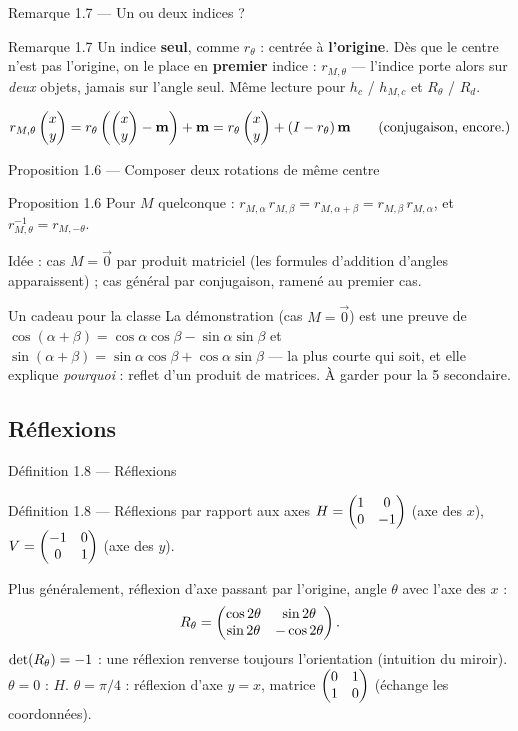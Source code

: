 \begin{frame}{Remarque 1.7 --- Un ou deux indices ?}
  \begin{Rem}{Remarque 1.7}
    Un indice \textbf{seul}, comme $r_\theta$ : centrée à
    \textbf{l'origine}. Dès que le centre n'est pas l'origine, on le
    place en \textbf{premier} indice : $r_{M,\theta}$ --- l'indice
    porte alors sur \emph{deux} objets, jamais sur l'angle seul. Même
    lecture pour $h_c$ / $h_{M,c}$ et $R_\theta$ / $R_d$.
  \end{Rem}
  \[
    r_{M,\theta}\begin{pmatrix}x\\ y\end{pmatrix}
      = r_\theta\left(\begin{pmatrix}x\\ y\end{pmatrix} - \mathbf{m}\right) + \mathbf{m}
      = r_\theta\begin{pmatrix}x\\ y\end{pmatrix} + (I - r_\theta)\,\mathbf{m}
      \qquad\text{(conjugaison, encore.)}
  \]
\end{frame}

\begin{frame}{Proposition 1.6 --- Composer deux rotations de même centre}
  \begin{Enonce}{Proposition 1.6}
    Pour $M$ quelconque :
    $r_{M,\alpha}\,r_{M,\beta} = r_{M,\alpha+\beta} = r_{M,\beta}\,r_{M,\alpha}$,
    et $r_{M,\theta}^{-1} = r_{M,-\theta}$.
  \end{Enonce}
  \begin{AuTableau}
    \small Idée : cas $M=\vec 0$ par produit matriciel (les formules
    d'addition d'angles apparaissent) ; cas général par conjugaison,
    ramené au premier cas.
  \end{AuTableau}
  \begin{Classe}{Un cadeau pour la classe}
    \small La démonstration (cas $M=\vec 0$) est une preuve de
    $\cos(\alpha+\beta)=\cos\alpha\cos\beta-\sin\alpha\sin\beta$ et
    $\sin(\alpha+\beta)=\sin\alpha\cos\beta+\cos\alpha\sin\beta$ --- la
    plus courte qui soit, et elle explique \emph{pourquoi} : reflet
    d'un produit de matrices. À garder pour la 5 secondaire.
  \end{Classe}
\end{frame}

\subsection{Réflexions}
\begin{frame}{Définition 1.8 --- Réflexions}
  \begin{Enonce}{Définition 1.8 --- Réflexions par rapport aux axes}
    $H = \begin{pmatrix}1 & 0\\ 0 & -1\end{pmatrix}$ (axe des $x$), $V=\begin{pmatrix}-1 & 0\\ 0 & 1\end{pmatrix}$ (axe
    des $y$).
  \end{Enonce}
  Plus généralement, réflexion d'axe passant par l'origine, angle
  $\theta$ avec l'axe des $x$ :
  \[
    R_\theta = \begin{pmatrix}\cos 2\theta & \sin 2\theta\\ \sin 2\theta & -\cos 2\theta\end{pmatrix}.
  \]
  \small $\operatorname{det}(R_\theta) = -1$ : une réflexion renverse toujours
  l'orientation (intuition du miroir). $\theta=0$ : $H$. $\theta=\pi/4$ :
  réflexion d'axe $y=x$, matrice $\begin{pmatrix}0 & 1\\ 1 & 0\end{pmatrix}$ (échange les
  coordonnées).
\end{frame}

